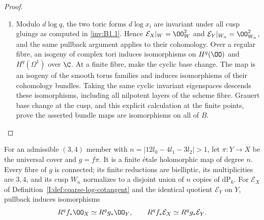 \begin{proof}
\begin{enumerate}[label=\arabic*.,leftmargin=*]
\item Modulo $d\log q$, the two toric forms $d\log x_i$ are invariant
under all cusp gluings as computed in \ref{inv:B1.1}. Hence
$\mathcal E_X|_W=\OO_W^2$ and $\mathcal E_Y|_{W_n}=\OO_{W_n}^2$,
and the same pullback argument applies to their cohomology.
Over a regular fibre, an isogeny of complex tori induces isomorphisms
on $H^q(\OO)$ and $H^q(\Omega^1)$ over $\C$.
At a finite fibre, make the cyclic base change. The map is an isogeny
of the smooth torus families and induces isomorphisms of their
cohomology bundles. Taking the same cyclic invariant eigenspaces
descends these isomorphisms, including all nilpotent layers of the
scheme fibre. Grauert base change at the cusp, and this explicit
calculation at the finite points, prove the asserted bundle maps are
isomorphisms on all of $B$.
\end{enumerate}
\end{proof}

\begin{proposition}\hypertarget{tag-01S7}{}\label{inv:B3.1}

For an admissible $(3,4)$ member with
$n=|12l_0-4l_1-3l_2|>1$, let $\pi:Y\to X$ be the universal
cover and $g=f\pi$. It is a finite \'etale holomorphic map of degree $n$.
Every fibre of $g$ is connected; its finite reductions are bielliptic,
its multiplicities are $3,4$, and its cusp $W_n$ normalizes to a
disjoint union of $n$ copies of $\mathrm{dP}_6$.
For $\mathcal E_X$ of Definition~\ref{I:def:coarse-log-cotangent}
and the identical quotient $\mathcal E_Y$ on $Y$, pullback induces isomorphisms
\[
R^qf_*\OO_X\simeq R^qg_*\OO_Y,\qquad
R^qf_*\mathcal E_X\simeq R^qg_*\mathcal E_Y.
\]
\end{proposition}


